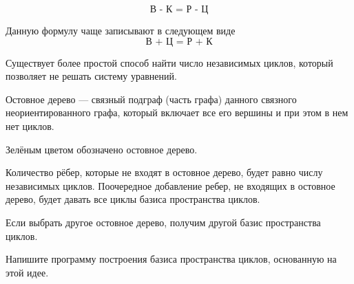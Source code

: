 \documentclass[russian]{lecture-notes}
\begin{document}
\begin{equation*}
    \text{В - К = Р - Ц}
    \label{eq:Eyler}
\end{equation*}

\begin{note}
    Данную формулу чаще записывают в следующем виде $$\text{В + Ц = Р + К}$$
\end{note}

\begin{note}

Существует более простой способ найти число независимых циклов, который позволяет не решать систему уравнений.

\begin{definition}
    Остовное дерево — связный подграф (часть графа) данного связного неориентированного графа, который включает все его вершины и при этом в нем нет циклов.
\end{definition}

\begin{figure}[H]
    \centering
\end{figure}

\begin{note}
    Зелёным цветом обозначено остовное дерево.
\end{note}

Количество рёбер, которые не входят в остовное дерево, будет равно числу независимых циклов. Поочередное добавление ребер, не входящих в остовное дерево, будет давать все циклы базиса пространства циклов.

\begin{note}
    Если выбрать другое остовное дерево, получим другой базис пространства циклов.
\end{note}

\begin{problem}
    Напишите программу построения базиса пространства циклов, основанную на этой идее.
\end{problem}

\end{note}
\end{document}
